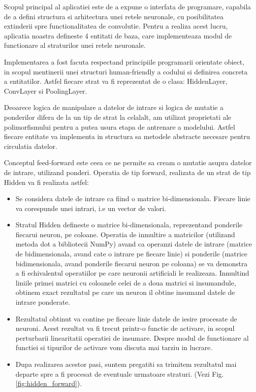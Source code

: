 	\vfill
	
	Scopul principal al aplicatiei este de a expune o interfata de programare, capabila de a defini structura si arhitectura unei retele neuronale, cu posibilitatea extinderii spre functionalitatea de convolutie. Pentru a realiza acest lucru, aplicatia noastra defineste 4 entitati de baza, care implementeaza modul de functionare al straturilor unei retele neuronale. 
	
	Implementarea a fost facuta respectand principiile programarii orientate obiect, in scopul mentinerii unei structuri human-friendly a codului si definirea concreta a entitatilor. Astfel fiecare strat va fi reprezentat de o clasa: HiddenLayer, ConvLayer si PoolingLayer. 
	
	Deoarece logica de manipulare a datelor de intrare si logica de mutatie a ponderilor difera de la un tip de strat la celalalt, am utilizat proprietati ale polimorfismului pentru a putea usura etapa de antrenare a modelului. Astfel fiecare entitate va implementa in structura sa metodele abstracte necesare pentru circulatia datelor. 
	
	Conceptul feed-forward este ceea ce ne permite sa cream o mutatie asupra datelor de intrare, utilizand ponderi. 
	Operatia de tip forward, realizata de un strat de tip Hidden va fi realizata astfel: 
	
	\begin{itemize}
	\item	Se considera datele de intrare ca fiind o matrice bi-dimensionala. Fiecare linie va corespunde unei intrari, i.e un vector de valori.
	
	\item	Stratul Hidden defineste o matrice bi-dimensionala, reprezentand ponderile fiecarui neuron, pe coloane. Operatia de inmultire a matricilor (utilizand metoda dot a bibliotecii NumPy) avand ca operanzi datele de intrare (matrice de bidimensionala, avand cate o intrare pe fiecare linie) si ponderile (matrice bidimensionala, avand ponderile fiecarui neuron pe coloana) se va demonstra a fi echivalentul operatiilor pe care neuronii artificiali le realizeaza.  Inmultind liniile primei matrici cu coloanele celei de a doua matrici si insumandule, obtinem exact rezultatul pe care un neuron il obtine insumand datele de intrare ponderate. 
	
	
	\item	Rezultatul obtinut va contine pe fiecare linie datele de iesire procesate de neuroni. Acest rezultat va fi trecut printr-o functie de activare, in scopul perturbarii linearitatii operatiei de insumare. Despre modul de functionare al functiei si tipurilor de activare vom discuta mai tarziu in lucrare.
	
	\item	Dupa realizarea acestor pasi, suntem pregatiti sa trimitem rezultatul mai departe spre a fi procesat de eventuale urmatoare straturi. (Vezi Fig. \ref{fig:hidden_forward}).
	\end{itemize}

